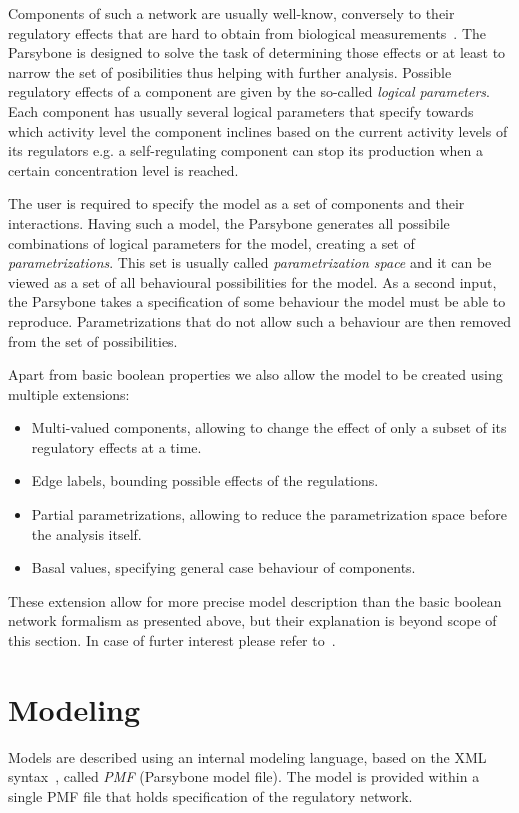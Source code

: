 \documentclass[12pt]{article}
\begin{document}
Components of such a network are usually well-know, conversely to their regulatory effects that are hard to obtain from biological measurements~\cite{Hecker09}. The Parsybone is designed to solve the task of determining those effects or at least to narrow the set of posibilities thus helping with further analysis. Possible regulatory effects of a component are given by the so-called \emph{logical parameters}. Each component has usually several logical parameters that specify towards which activity level the component inclines based on the current activity levels of its regulators e.g. a self-regulating component can stop its production when a certain concentration level is reached.

The user is required to specify the model as a set of components and their interactions. Having such a model, the Parsybone generates all possibile combinations of logical parameters for the model, creating a set of \emph{parametrizations}. This set is usually called \emph{parametrization space} and it can be viewed as a set of all behavioural possibilities for the model. As a second input, the Parsybone takes a specification of some behaviour the model must be able to reproduce. Parametrizations that do not allow such a behaviour are then removed from the set of possibilities.

Apart from basic boolean properties we also allow the model to be created using multiple extensions:
\begin{itemize}
\item Multi-valued components, allowing to change the effect of only a subset of its regulatory effects at a time.
\item Edge labels, bounding possible effects of the regulations.
\item Partial parametrizations, allowing to reduce the parametrization space before the analysis itself.
\item Basal values, specifying general case behaviour of components.
\end{itemize}

These extension allow for more precise model description than the basic boolean network formalism as presented above, but their explanation is beyond scope of this section. In case of furter interest please refer to~\cite{TechReport}.

\section{Modeling}
\label{sec:modeling}
 Models are described using an internal modeling language, based on the XML syntax~\cite{XML}, called \emph{PMF} (Parsybone model file). The model is provided within a single PMF file that holds specification of the regulatory network. 
 
\end{document}
